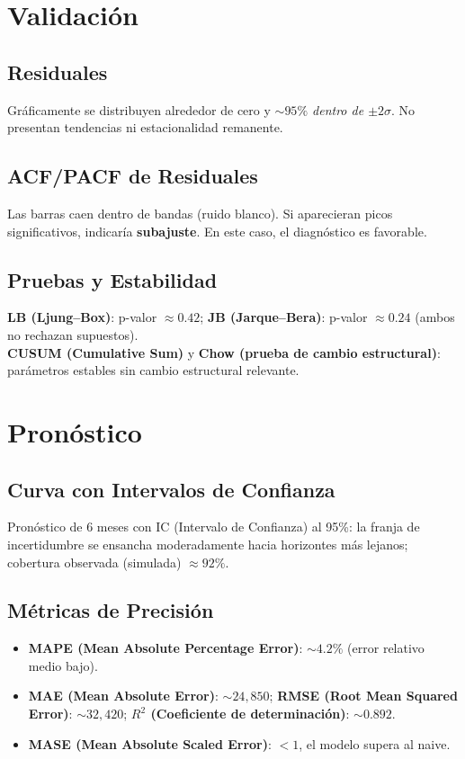 \documentclass[11pt,a4paper]{article}
\begin{document}
\section{Validación}
\subsection{Residuales}
Gráficamente se distribuyen alrededor de cero y \textit{$\sim95\%$ dentro de $\pm2\sigma$}. No presentan tendencias ni estacionalidad remanente.

\subsection{ACF/PACF de Residuales}
Las barras caen dentro de bandas (ruido blanco). Si aparecieran picos significativos, indicaría \textbf{subajuste}. En este caso, el diagnóstico es favorable.

\subsection{Pruebas y Estabilidad}
\textbf{LB (Ljung--Box)}: p-valor $\approx 0.42$; \textbf{JB (Jarque--Bera)}: p-valor $\approx 0.24$ (ambos no rechazan supuestos).\\
\textbf{CUSUM (Cumulative Sum)} y \textbf{Chow (prueba de cambio estructural)}: parámetros estables sin cambio estructural relevante.

\section{Pronóstico}
\subsection{Curva con Intervalos de Confianza}
Pronóstico de 6 meses con IC (Intervalo de Confianza) al 95\%: la franja de incertidumbre se ensancha moderadamente hacia horizontes más lejanos; cobertura observada (simulada) $\approx92\%$.

\subsection{Métricas de Precisión}
\begin{itemize}
  \item \textbf{MAPE (Mean Absolute Percentage Error)}: $\sim4.2\%$ (error relativo medio bajo).
  \item \textbf{MAE (Mean Absolute Error)}: $\sim24{,}850$; \textbf{RMSE (Root Mean Squared Error)}: $\sim32{,}420$; \textbf{$R^2$ (Coeficiente de determinación)}: $\sim0.892$.
  \item \textbf{MASE (Mean Absolute Scaled Error)}: $<1$, el modelo supera al naive.
\end{itemize}
\end{document}
